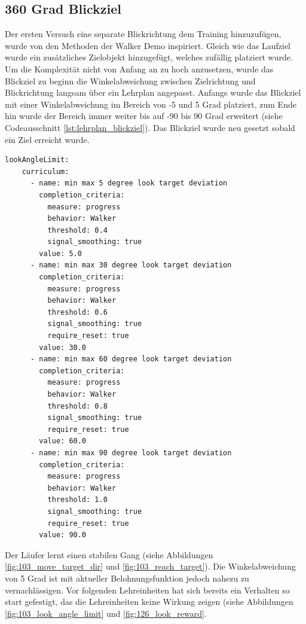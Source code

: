 \subsection{360 Grad Blickziel}
Der ersten Versuch eine separate Blickrichtung dem Training hinzuzufügen, wurde von den Methoden der Walker Demo inspiriert. Gleich wie das Laufziel wurde ein zusätzliches Zielobjekt hinzugefügt, welches zufällig platziert wurde. Um die Komplexität nicht von Anfang an zu hoch anzusetzen, wurde das Blickziel zu beginn die Winkelabweichung zwischen Zielrichtung und Blickrichtung langsam über ein Lehrplan angepasst. Anfangs wurde das Blickziel mit einer Winkelabweichung im Bereich von -5 und 5 Grad platziert, zum Ende hin wurde der Bereich immer weiter bis auf -90 bis 90 Grad erweitert (siehe Codeausschnitt \ref{lst:lehrplan_blickziel}). Das Blickziel wurde neu gesetzt sobald ein Ziel erreicht wurde.

\begin{lstlisting}[caption={ Lehrplan für das Blickziel},captionpos=b,label={lst:lehrplan_blickziel}]
lookAngleLimit:
    curriculum:
      - name: min max 5 degree look target deviation
        completion_criteria:
          measure: progress
          behavior: Walker
          threshold: 0.4
          signal_smoothing: true
        value: 5.0
      - name: min max 30 degree look target deviation
        completion_criteria:
          measure: progress
          behavior: Walker
          threshold: 0.6
          signal_smoothing: true
          require_reset: true
        value: 30.0
      - name: min max 60 degree look target deviation
        completion_criteria:
          measure: progress
          behavior: Walker
          threshold: 0.8
          signal_smoothing: true
          require_reset: true
        value: 60.0
      - name: min max 90 degree look target deviation
        completion_criteria:
          measure: progress
          behavior: Walker
          threshold: 1.0
          signal_smoothing: true
          require_reset: true
        value: 90.0
\end{lstlisting}

Der Läufer lernt einen stabilen Gang (siehe Abbildungen \ref{fig:103_move_target_dir} und \ref{fig:103_reach_target}). Die Winkelabweichung von 5 Grad ist mit aktueller Belohnungsfunktion jedoch nahezu zu vernachlässigen. Vor folgenden Lehreinheiten hat sich bereits ein Verhalten so start gefestigt, das die Lehreinheiten keine Wirkung zeigen (siehe Abbildungen \ref{fig:103_look_angle_limit} und \ref{fig:126_look_reward}.


